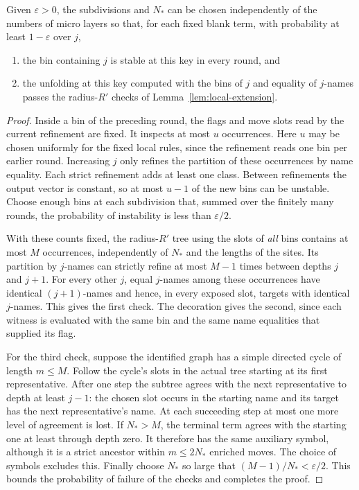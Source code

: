 \begin{lemma}\label{lem:finite-names}
Given \(\varepsilon>0\), the subdivisions and \(N_*\) can be chosen
independently of the numbers of micro layers so that, for each fixed blank
term, with probability at least \(1-\varepsilon\) over \(j\),
\begin{enumerate}
\item the bin containing \(j\) is stable at this key in every round, and
\item the unfolding at this key computed with the bins of \(j\) and
equality of \(j\)-names passes the radius-\(R'\) checks of
Lemma~\ref{lem:local-extension}.
\end{enumerate}
\end{lemma}
\begin{proof}
Inside a bin of the preceding round, the flags and move slots read by the
current refinement are fixed. It inspects at most \(u\) occurrences. Here
\(u\) may be chosen uniformly for the fixed local rules, since the
refinement reads one bin per earlier round. Increasing \(j\) only refines
the partition of these occurrences by name equality. Each strict
refinement adds at least one class. Between refinements the output vector
is constant, so at most \(u-1\) of the new bins can be unstable. Choose
enough bins at each subdivision that, summed over the finitely many
rounds, the probability of instability is less than \(\varepsilon/2\).

With these counts fixed, the radius-\(R'\) tree using the slots of
\emph{all} bins contains at most \(M\) occurrences, independently of
\(N_*\) and the lengths of the sites. Its partition by \(j\)-names
can strictly refine at most \(M-1\) times between depths \(j\) and
\(j+1\). For every other \(j\), equal \(j\)-names among these occurrences
have identical \((j+1)\)-names and hence, in every exposed slot, targets
with identical \(j\)-names. This gives the first check. The decoration
gives the second, since each witness is evaluated with the same bin and
the same name equalities that supplied its flag.

For the third check, suppose the identified graph has a simple directed
cycle of length \(m\le M\). Follow the cycle's slots in the actual tree
starting at its first representative. After one step the subtree agrees
with the next representative to depth at least \(j-1\): the chosen slot
occurs in the starting name and its target has the next representative's
name. At each succeeding step at most one more level of agreement is
lost. If \(N_*>M\), the terminal term agrees with the starting one at
least through depth zero. It therefore has the same auxiliary symbol,
although it is a strict ancestor within \(m\le 2N_*\) enriched moves.
The choice of symbols excludes this. Finally choose \(N_*\) so large
that \((M-1)/N_*<\varepsilon/2\). This bounds the probability of failure
of the checks and completes the proof.
\end{proof}

